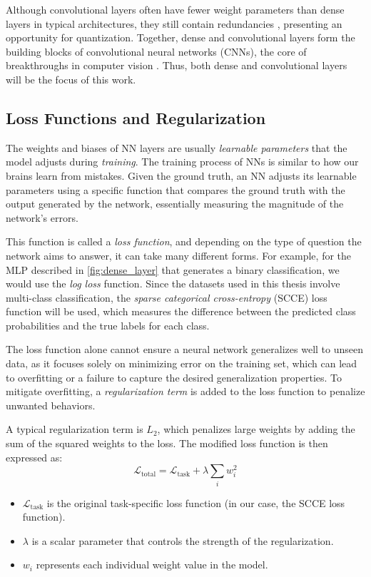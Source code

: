 Although convolutional layers often have fewer weight parameters than dense layers in typical architectures, 
they still contain redundancies \cite{huang2017densely}, presenting an opportunity for quantization. 
Together, dense and convolutional layers form the building blocks of convolutional neural networks (CNNs), 
the core of breakthroughs in computer vision \cite{DBLP:journals/nature/LeCunBH15, DBLP:conf/nips/KrizhevskySH12, DBLP:conf/cvpr/SzegedyLJSRAEVR15}.
Thus, both dense and convolutional layers will be the focus of this work.



\subsection{Loss Functions and Regularization}
\label{subsec:lossregularization}
\hspace*{1em}The weights and biases of NN layers are usually \textit{learnable parameters}
that the model adjusts during \textit{training}.
The training process of NNs is similar to how our brains learn from mistakes. 
Given the ground truth, an NN adjusts its learnable parameters 
using a specific function that compares the ground truth with the output generated by the network, 
essentially measuring the magnitude of the network's errors.

This function is called a \textit{loss function}, and depending on the type of question the network aims to answer, it can take many different forms.
For example, for the MLP described in \cref{fig:dense_layer} that generates a binary classification, we would use the \textit{log loss} function. 
Since the datasets used in this thesis involve multi-class classification, the \textit{sparse categorical cross-entropy} (SCCE) loss function will be used, 
which measures the difference between the predicted class probabilities and the true labels for each class.

The loss function alone cannot ensure a neural network generalizes well to unseen data, 
as it focuses solely on minimizing error on the training set,
which can lead to overfitting or a failure to capture the desired generalization properties.
To mitigate overfitting,
a \textit{regularization term} is added to the loss function
to penalize unwanted behaviors.

A typical regularization term is \( L_2 \), 
which penalizes large weights by adding the sum of the squared weights to the loss. 
The modified loss function is then expressed as:
\[
\mathcal{L}_{\text{total}} = \mathcal{L}_{\text{task}} + \lambda \sum_{i} w_i^2
\]
\begin{itemize}
  \item \( \mathcal{L}_{\text{task}} \) is the original task-specific loss function (in our case, the SCCE loss function).
  \item \( \lambda \) is a scalar parameter that controls the strength of the regularization.
  \item \( w_i \) represents each individual weight value in the model.
\end{itemize}

